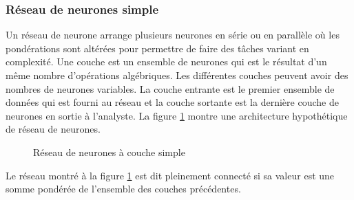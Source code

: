     \subsubsection{Réseau de neurones simple}
      Un réseau de neurone arrange plusieurs neurones en série ou en parallèle où les pondérations sont altérées pour permettre de faire des tâches variant en complexité. Une couche est un ensemble de neurones qui est le résultat d'un même nombre d'opérations algébriques. Les différentes couches peuvent avoir des nombres de neurones variables. La couche entrante est le premier ensemble de données qui est fourni au réseau et la couche sortante est la dernière couche de neurones en sortie à l'analyste. La figure \ref{fig:perceptron} montre une architecture hypothétique de réseau de neurones.\par
      \begin{figure}[!h]
        \centering
        \caption{Réseau de neurones à couche simple}
        \label{fig:perceptron}
      \end{figure}
      Le réseau montré à la figure \ref{fig:perceptron} est dit pleinement connecté si sa valeur est une somme pondérée de l'ensemble des couches précédentes. 
      \FloatBarrier
